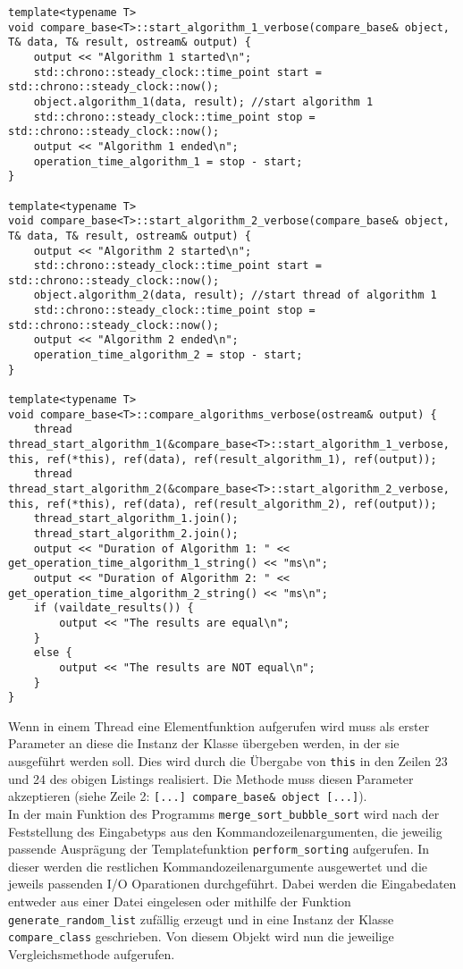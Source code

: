 \begin{lstlisting}
template<typename T>
void compare_base<T>::start_algorithm_1_verbose(compare_base& object, T& data, T& result, ostream& output) {
	output << "Algorithm 1 started\n";
	std::chrono::steady_clock::time_point start = std::chrono::steady_clock::now();
	object.algorithm_1(data, result); //start algorithm 1
	std::chrono::steady_clock::time_point stop = std::chrono::steady_clock::now();
	output << "Algorithm 1 ended\n";
	operation_time_algorithm_1 = stop - start;
}

template<typename T>
void compare_base<T>::start_algorithm_2_verbose(compare_base& object, T& data, T& result, ostream& output) {
	output << "Algorithm 2 started\n";
	std::chrono::steady_clock::time_point start = std::chrono::steady_clock::now();
	object.algorithm_2(data, result); //start thread of algorithm 1
	std::chrono::steady_clock::time_point stop = std::chrono::steady_clock::now();
	output << "Algorithm 2 ended\n";
	operation_time_algorithm_2 = stop - start;
}

template<typename T>
void compare_base<T>::compare_algorithms_verbose(ostream& output) {
	thread thread_start_algorithm_1(&compare_base<T>::start_algorithm_1_verbose, this, ref(*this), ref(data), ref(result_algorithm_1), ref(output));
	thread thread_start_algorithm_2(&compare_base<T>::start_algorithm_2_verbose, this, ref(*this), ref(data), ref(result_algorithm_2), ref(output));
	thread_start_algorithm_1.join();
	thread_start_algorithm_2.join();
	output << "Duration of Algorithm 1: " << get_operation_time_algorithm_1_string() << "ms\n";
	output << "Duration of Algorithm 2: " << get_operation_time_algorithm_2_string() << "ms\n";
	if (vaildate_results()) {
		output << "The results are equal\n";
	}
	else {
		output << "The results are NOT equal\n";
	}
}
\end{lstlisting}
Wenn in einem Thread eine Elementfunktion aufgerufen wird muss als erster Parameter an diese die Instanz der Klasse übergeben werden, in der sie ausgeführt werden soll. Dies wird durch die Übergabe von \texttt{this} in den Zeilen 23 und 24 des obigen Listings realisiert. Die Methode muss diesen Parameter akzeptieren (siehe Zeile 2: \texttt{[...] compare\_base\& object [...]}).\\
In der main Funktion des Programms \texttt{merge\_sort\_bubble\_sort} wird nach der Feststellung des Eingabetyps aus den Kommandozeilenargumenten, die jeweilig passende Ausprägung der Templatefunktion \texttt{perform\_sorting} aufgerufen. In dieser werden die restlichen Kommandozeilenargumente ausgewertet und die jeweils passenden \ac{I/O} Oparationen durchgeführt. Dabei werden die Eingabedaten entweder aus einer Datei eingelesen oder mithilfe der Funktion \texttt{generate\_random\_list} zufällig erzeugt und in eine Instanz der Klasse \texttt{compare\_class} geschrieben. Von diesem Objekt wird nun die jeweilige Vergleichsmethode aufgerufen.

